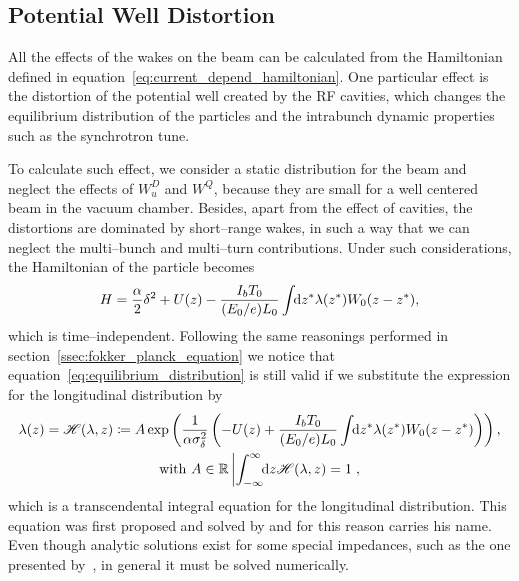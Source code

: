 \subsection{Potential Well Distortion}

    All the effects of the wakes on the beam can be calculated from the Hamiltonian defined in equation~\eqref{eq:current_depend_hamiltonian}. One particular effect is the distortion of the potential well created by the RF cavities, which changes the equilibrium distribution of the particles and the intrabunch dynamic properties such as the synchrotron tune.

    To calculate such effect, we consider a static distribution for the beam and neglect the effects of $W^D_u$ and $W^Q$, because they are small for a well centered beam in the vacuum chamber. Besides, apart from the effect of cavities,
    the distortions are dominated by short--range wakes, in such a way that we can neglect the multi--bunch and multi--turn contributions. Under such considerations, the Hamiltonian of the particle becomes
    \begin{align}
        H = \frac\alpha2\delta^2 + U(z) -
            \frac{I_bT_0}{(E_0/e)L_0}\int\!\!\text{d}z^* \lambda(z^*) W_0(z-z^*),
    \end{align}
    which is time--independent. Following the same reasonings performed in section~\ref{ssec:fokker_planck_equation} we notice that equation~\eqref{eq:equilibrium_distribution} is still valid if we substitute the expression for the longitudinal distribution by
    \begin{gather}\label{eq:haissinski_equation}
        \lambda(z) = \mathscr{H}(\lambda,z) \coloneqq A\exp\left(\frac{1}{\alpha\sigma_\delta^2}\left(
            -U(z) + \frac{I_bT_0}{(E_0/e)L_0}\int\!\!\text{d}z^* \lambda(z^*) W_0(z-z^*)\right)\right),\\\nonumber
            \text{with}\,\,A \in \mathbb{R} \left| \int_{-\infty}^{\infty}\!\!\text{d}z \mathscr{H}(\lambda,z)=1\right.,
    \end{gather}
    which is a transcendental integral equation for the longitudinal distribution. This equation was first proposed and solved by  and for this reason carries his name. Even though analytic solutions exist for some special impedances, such as the one presented by~, in general it must be solved numerically.

